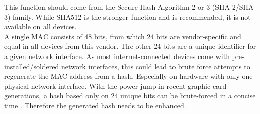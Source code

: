         This function should come from the Secure Hash Algorithm 2 or 3 (SHA-2/SHA-3) family. While SHA512 is the stronger function and is recommended, it is not available on all devices.\\
        A single MAC consists of 48 bits, from which 24 bits are vendor-specific and equal in all devices from this vendor. The other 24 bits are a unique identifier for a given network interface. As most internet-connected devices come with pre-installed/soldered network interfaces, this could lead to brute force attempts to regenerate the MAC address from a hash. Especially on hardware with only one physical network interface. With the power jump in recent graphic card generations, a hash based only on 24 unique bits can be brute-forced in a concise time \cite{tirado_new_2018}. Therefore the generated hash needs to be enhanced.\\
        
